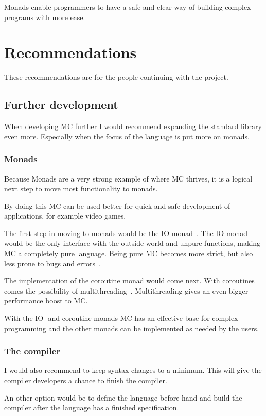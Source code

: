 Monads enable programmers to have a safe and clear way of building complex programs with more ease.



\chapter{Recommendations}\label{chap:resultsrecommendations}
These recommendations are for the people continuing with the project.

\section{Further development}
When developing MC further I would recommend expanding the standard library even more.
Especially when the focus of the language is put more on monads.

\subsection{Monads}
Because Monads are a very strong example of where MC thrives, it is a logical next step to move most functionality to monads.

By doing this MC can be used better for quick and safe development of applications, for example video games.

The first step in moving to monads would be the IO monad~\cite{hancock1999io}.
The IO monad would be the only interface with the outside world and unpure functions, making MC a completely pure language.
Being pure MC becomes more strict, but also less prone to bugs and errors~\cite{wadler1995monads}.

The implementation of the coroutine monad would come next.
With coroutines comes the possibility of multithreading~\cite{haynes1984continuations}.
Multithreading gives an even bigger performance boost to MC.

With the IO- and coroutine monads MC has an effective base for complex programming and the other monads can be implemented as needed by the users.


\subsection{The compiler}
I would also recommend to keep syntax changes to a minimum.
This will give the compiler developers a chance to finish the compiler.

An other option would be to define the language before hand and build the compiler after the language has a finished specification.



